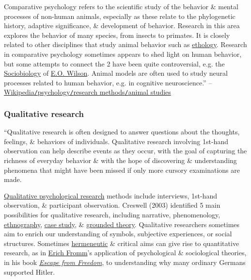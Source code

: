 \documentclass[oneside]{book}
\numberwithin{equation}{section}
\begin{document}
Comparative psychology refers to the scientific study of the behavior \& mental processes of non-human animals, especially as these relate to the phylogenetic history, adaptive significance, \& development of behavior. Research in this area explores the behavior of many species, from insects to primates. It is closely related to other disciplines that study animal behavior such as \href{https://en.wikipedia.org/wiki/Ethology}{ethology}. Research in comparative psychology sometimes appears to shed light on human behavior, but some attempts to connect the 2 have been quite controversial, e.g. the \href{https://en.wikipedia.org/wiki/Sociobiology}{Sociobiology} of \href{https://en.wikipedia.org/wiki/E.O._Wilson}{E.O. Wilson}. Animal models are often used to study neural processes related to human behavior, e.g. in cognitive neuroscience.'' -- \href{https://en.wikipedia.org/wiki/Psychology#Animal_studies}{Wikipedia\texttt{/}psychology\texttt{/}research methods\texttt{/}animal studies}

\subsubsection{Qualitative research}
``Qualitative research is often designed to answer questions about the thoughts, feelings, \& behaviors of individuals. Qualitative research involving 1st-hand observation can help describe events as they occur, with the goal of capturing the richness of everyday behavior \& with the hope of discovering \& understanding phenomena that might have been missed if only more cursory examinations are made.

\href{https://en.wikipedia.org/wiki/Qualitative_psychological_research}{Qualitative psychological research} methods include interviews, 1st-hand observation, \& participant observation. Creswell (2003) identified 5 main possibilities for qualitative research, including narrative, phenomenology, \href{https://en.wikipedia.org/wiki/Ethnography}{ethnography}, \href{https://en.wikipedia.org/wiki/Case_study}{case study}, \& \href{https://en.wikipedia.org/wiki/Grounded_theory}{grounded theory}. Qualitative researchers sometimes aim to enrich our understanding of symbols, subjective experiences, or social structures. Sometimes \href{https://en.wikipedia.org/wiki/Hermeneutic}{hermeneutic} \& critical aims can give rise to quantitative research, as in \href{https://en.wikipedia.org/wiki/Erich_Fromm}{Erich Fromm}'s application of psychological \& sociological theories, in his book \href{https://en.wikipedia.org/wiki/Escape_from_Freedom}{\textit{Escape from Freedom}}, to understanding why many ordinary Germans supported Hitler.
\end{document}
